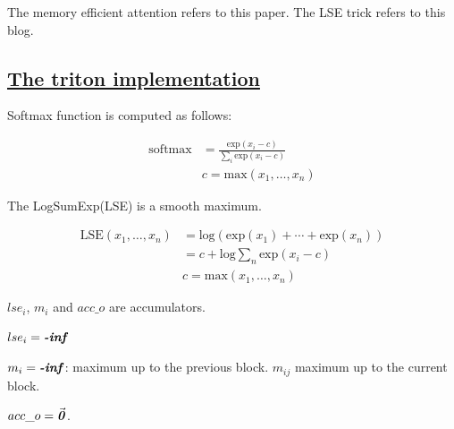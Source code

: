 The memory efficient attention refers to this paper\cite{DBLP:journals/corr/abs-2112-05682}.
The LSE trick refers to this blog\cite{lse-trick}.

\subsection{\href{https://github.com/HazyResearch/flash-attention/blob/main/flash_attn/flash_attn_triton.py}{The triton implementation}}

Softmax function is computed as follows:

\begin{align*}
    \text{softmax} &= \frac{\text{exp}\left(x_i -c\right)}{\sum_{i}\text{exp}\left(x_i -c\right)} \\
    &c = \text{max}(x_1,\ldots, x_n)
\end{align*}

The LogSumExp(LSE) is a smooth maximum.

\begin{align*}
    \text{LSE}(x_1, \ldots ,x_n) &= \text{log}\left( \text{exp}\left(x_1\right)+\cdots+\text{exp}\left(x_n\right)\right) \\
    &=c + \text{log}\sum_{n}\text{exp}(x_i - c) \\
    &c = \text{max}(x_1,\ldots, x_n)
\end{align*}

$lse_i$, $m_i$ and $acc\_o$ are accumulators.

$lse_i=\textbf{\textit{-inf}}$

$m_i=\textbf{\textit{-inf}}$: maximum up to the previous block.
$m_{ij}$ maximum up to the current block.

$acc\_o = \vec{\textbf{\textit{0}}}$.


